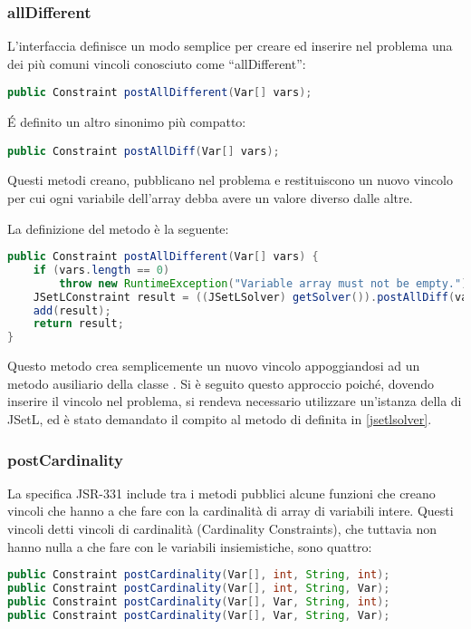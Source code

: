 \subsubsection{allDifferent}
L'interfaccia  definisce un modo semplice per creare ed inserire
nel problema una dei più comuni vincoli conosciuto come ``allDifferent'':
\begin{center}
\lstinline[language = Java]$public Constraint postAllDifferent(Var[] vars);$
\end{center}
\'E definito un altro sinonimo più compatto:
\begin{center}
\lstinline[language = Java]$public Constraint postAllDiff(Var[] vars);$
\end{center}
Questi metodi creano, pubblicano nel problema e restituiscono un nuovo vincolo
per cui ogni variabile dell'array  debba avere un valore diverso 
dalle altre.

La definizione del metodo è la seguente:
\begin{lstlisting}[language = Java,
                   caption = {\files{allDifferent}.}]
public Constraint postAllDifferent(Var[] vars) {
	if (vars.length == 0)
		throw new RuntimeException("Variable array must not be empty.");
	JSetLConstraint result = ((JSetLSolver) getSolver()).postAllDiff(vars);
	add(result);
	return result;
}
\end{lstlisting}
Questo metodo crea semplicemente un nuovo vincolo appoggiandosi ad un metodo 
ausiliario della classe . Si è seguito questo approccio 
poiché, dovendo inserire il vincolo nel problema, si rendeva necessario 
utilizzare un'istanza della  di JSetL, ed è stato demandato 
il compito al metodo  di  definita in 
\ref{jsetlsolver}. 

\subsubsection{postCardinality}
La specifica JSR-331 include tra i metodi pubblici alcune funzioni che
creano vincoli che hanno a che fare con la cardinalità di array di variabili
intere. Questi vincoli detti vincoli di cardinalità (Cardinality Constraints), 
che tuttavia non hanno nulla a che fare con le variabili insiemistiche, sono
quattro:
\begin{lstlisting}[language = Java, frame = single]
public Constraint postCardinality(Var[], int, String, int);
public Constraint postCardinality(Var[], int, String, Var);
public Constraint postCardinality(Var[], Var, String, int);
public Constraint postCardinality(Var[], Var, String, Var);
\end{lstlisting}

